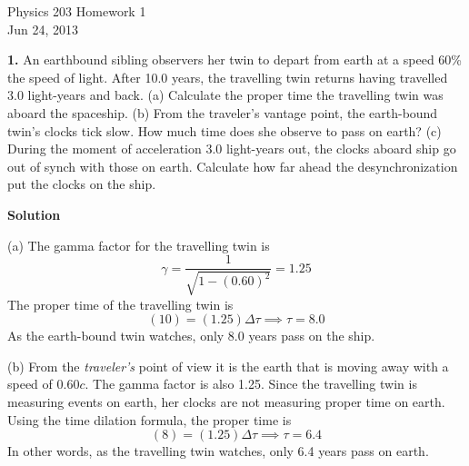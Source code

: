 \documentclass{article}
\begin{document}
\newpage

\begin{center}
\LARGE{Physics 203 Homework 1} \\[2mm]
\small{\sf Jun 24, 2013}
\end{center}


\textbf{1.}
\quad An earthbound sibling observers her twin to depart from earth at a
speed 60\% the speed of light. After 10.0 years, the travelling twin
returns having travelled 3.0 light-years and back. (a) Calculate the
proper time the travelling twin was aboard the spaceship. (b) From the
traveler's vantage point, the earth-bound twin's clocks tick slow. How
much time does she observe to pass on earth? (c) During the moment of
acceleration 3.0 light-years out, the clocks aboard ship go out of
synch with those on earth. Calculate how far ahead the
desynchronization put the clocks on the ship.
\par \textbf{Solution}
\par (a) The gamma factor for the travelling twin is
%
\begin{equation*}
\gamma = \frac{1}{\sqrt{1 - (0.60)^2}} = 1.25
\end{equation*}
The proper time of the travelling twin is
%
\begin{equation*}
(10) = (1.25) \Delta \tau \implies \tau = 8.0
\end{equation*}
As the earth-bound twin watches, only 8.0 years pass on the ship.

(b) From the \emph{traveler's} point of view it is the earth that is moving
away with a speed of $0.60c$. The gamma factor is also 1.25.
Since the travelling twin is measuring events on earth, her clocks are
not measuring proper time on earth. Using the time dilation formula,
the proper time is
%
\begin{equation*}
(8) = (1.25) \Delta \tau \implies \tau = 6.4
\end{equation*}
In other words, as the travelling twin watches, only 6.4 years pass on
earth.
\end{document}
